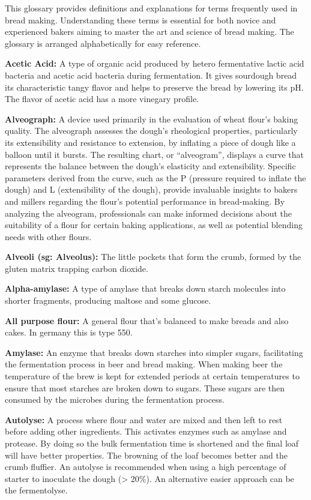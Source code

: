 \begin{quoting}
This glossary provides definitions and explanations for terms frequently
used in bread making. Understanding these terms is essential for both
novice and experienced bakers aiming to master the art and science of
bread making. The glossary is arranged alphabetically for easy reference.
\end{quoting}

\textbf{Acetic Acid:} A type of organic acid produced by hetero fermentative lactic
acid bacteria and acetic acid bacteria during fermentation. It gives sourdough bread
its characteristic tangy flavor and helps to preserve the bread by lowering its pH.
The flavor of acetic acid has a more vinegary profile.

\textbf{Alveograph:} A device used primarily in the evaluation of wheat flour's
baking quality. The alveograph assesses the dough's rheological properties,
particularly its extensibility and resistance to extension, by inflating a piece
of dough like a balloon until it bursts. The resulting chart, or ``alveogram'',
displays a curve that represents the balance between the dough's elasticity and
extensibility. Specific parameters derived from the curve, such as the P (pressure
required to inflate the dough) and L (extensibility of the dough), provide invaluable
insights to bakers and millers regarding the flour's potential performance in
bread-making. By analyzing the alveogram, professionals can make informed decisions
about the suitability of a flour for certain baking applications, as well as
potential blending needs with other flours.

\textbf{Alveoli (sg: Alveolus):} The little pockets that form the crumb, formed by
the gluten matrix trapping carbon dioxide.

\textbf{Alpha-amylase:} A type of amylase that breaks down starch molecules into
shorter fragments, producing maltose and some glucose.

\textbf{All purpose flour:} A general flour that’s balanced to make breads and also
cakes. In germany this is type 550.

\textbf{Amylase:} An enzyme that breaks down starches into simpler sugars, facilitating
the fermentation process in beer and bread making. When making beer the temperature
of the brew is kept for extended periods at certain temperatures to ensure that most
starches are broken down to sugars. These sugars are then consumed by the microbes
during the fermentation process.

\textbf{Autolyse:} A process where flour and water are mixed and then left to rest
before adding other ingredients. This activates enzymes such as amylase and protease.
By doing so the bulk fermentation time is shortened and the final loaf will have
better properties. The browning of the loaf becomes better and the crumb fluffier.
An autolyse is recommended when using a high percentage of starter to inoculate the
dough (> 20\%). An alternative easier approach can be the fermentolyse.

